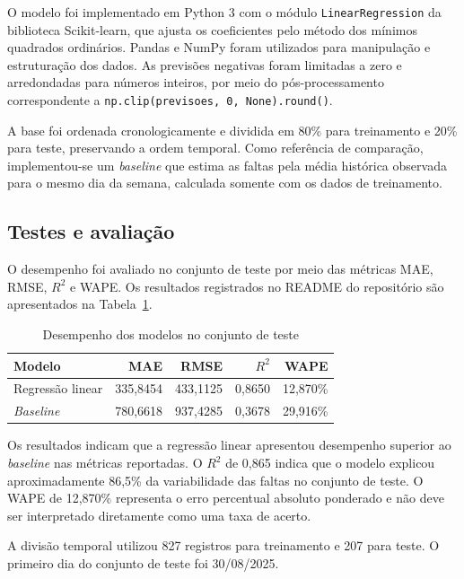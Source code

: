\documentclass[11pt,a4paper]{article}
\begin{document}
O modelo foi implementado em Python 3 com o módulo \texttt{LinearRegression} da biblioteca Scikit-learn, que ajusta os coeficientes pelo método dos mínimos quadrados ordinários. Pandas e NumPy foram utilizados para manipulação e estruturação dos dados. As previsões negativas foram limitadas a zero e arredondadas para números inteiros, por meio do pós-processamento correspondente a \texttt{np.clip(previsoes, 0, None).round()}.

A base foi ordenada cronologicamente e dividida em 80\% para treinamento e 20\% para teste, preservando a ordem temporal. Como referência de comparação, implementou-se um \textit{baseline} que estima as faltas pela média histórica observada para o mesmo dia da semana, calculada somente com os dados de treinamento.

\subsection{Testes e avaliação}

O desempenho foi avaliado no conjunto de teste por meio das métricas MAE, RMSE, $R^2$ e WAPE. Os resultados registrados no README do repositório são apresentados na Tabela~\ref{tab:resultados}.

\begin{table}[htbp]
    \centering
    \caption{Desempenho dos modelos no conjunto de teste}
    \label{tab:resultados}
    \begin{tabular}{lrrrr}
        \toprule
        Modelo & MAE & RMSE & $R^2$ & WAPE \\
        \midrule
        Regressão linear & 335,8454 & 433,1125 & 0,8650 & 12,870\% \\
        \textit{Baseline} & 780,6618 & 937,4285 & 0,3678 & 29,916\% \\
        \bottomrule
    \end{tabular}
\end{table}

Os resultados indicam que a regressão linear apresentou desempenho superior ao \textit{baseline} nas métricas reportadas. O $R^2$ de 0,865 indica que o modelo explicou aproximadamente 86,5\% da variabilidade das faltas no conjunto de teste. O WAPE de 12,870\% representa o erro percentual absoluto ponderado e não deve ser interpretado diretamente como uma taxa de acerto.

A divisão temporal utilizou 827 registros para treinamento e 207 para teste. O primeiro dia do conjunto de teste foi 30/08/2025.
\end{document}
